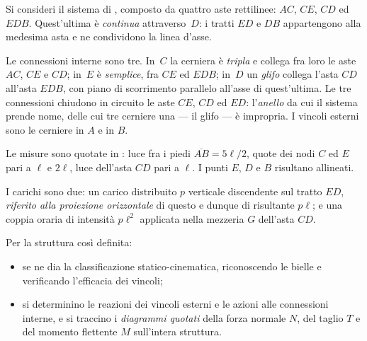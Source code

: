 \begin{esercizio}
	\label{ex:anello_vincolato_TA}
	
	Si consideri il sistema di , composto da
	quattro aste rettilinee: $AC$, $CE$, $CD$ ed $EDB$. Quest'ultima è
	\emph{continua} attraverso~$D$: i tratti $ED$ e $DB$ appartengono alla
	medesima asta e ne condividono la linea d'asse.
	
	Le connessioni interne sono tre. In~$C$ la cerniera è \emph{tripla} e
	collega fra loro le aste $AC$, $CE$ e $CD$; in~$E$ è \emph{semplice},
	fra $CE$ ed $EDB$; in~$D$ un \emph{glifo} collega l'asta $CD$ all'asta
	$EDB$, con piano di scorrimento parallelo all'asse di quest'ultima. Le
	tre connessioni chiudono in circuito le aste $CE$, $CD$ ed $ED$:
	l'\emph{anello} da cui il sistema prende nome, delle cui tre cerniere
	una --- il glifo --- è impropria. I vincoli esterni sono le cerniere in
	$A$ e in $B$.
	
	Le misure sono quotate in : luce fra i
	piedi $\overline{AB} = 5\ell/2$, quote dei nodi $C$ ed $E$ pari a
	$\ell$ e $2\ell$, luce dell'asta $CD$ pari a $\ell$. I punti $E$, $D$
	e $B$ risultano allineati.
	
	I carichi sono due: un carico distribuito $p$ verticale discendente
	sul tratto $ED$, \emph{riferito alla proiezione orizzontale} di
	questo e dunque di risultante $p\ell$; e una coppia oraria di
	intensità $p\ell^{2}$ applicata nella mezzeria $G$ dell'asta $CD$.
	



	
	Per la struttura così definita:
	\begin{itemize}
		\item[1)] se ne dia la classificazione statico-cinematica,
		riconoscendo le bielle e verificando l'efficacia dei vincoli;
		\item[2)] si determinino le reazioni dei vincoli esterni e le
		azioni alle connessioni interne, e si traccino i \textit{diagrammi
			quotati} della forza normale $N$, del taglio $T$ e del momento
		flettente $M$ sull'intera struttura.
	\end{itemize}
	

\end{esercizio}
